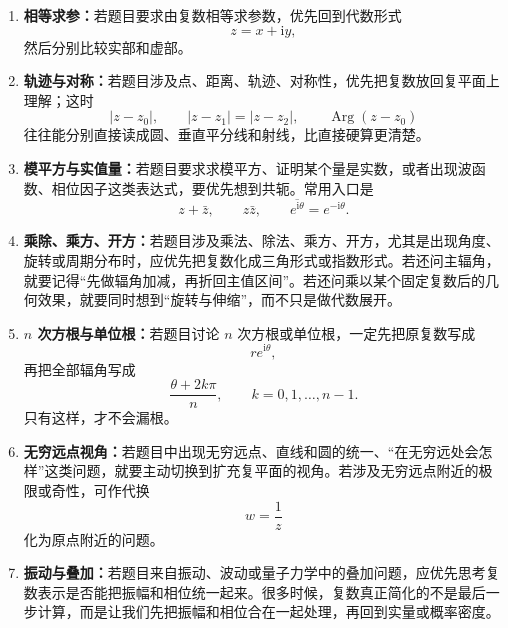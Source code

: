 \begin{tishi}[本章做题的判断思路]
\begin{enumerate}
    \item \textbf{相等求参：}若题目要求由复数相等求参数，优先回到代数形式
    \[
        z=x+\mathrm{i}y,
    \]
    然后分别比较实部和虚部。

    \item \textbf{轨迹与对称：}若题目涉及点、距离、轨迹、对称性，优先把复数放回复平面上理解；这时
    \[
        |z-z_0|,\qquad |z-z_1|=|z-z_2|,\qquad \operatorname{Arg}(z-z_0)
    \]
    往往能分别直接读成圆、垂直平分线和射线，比直接硬算更清楚。

    \item \textbf{模平方与实值量：}若题目要求求模平方、证明某个量是实数，或者出现波函数、相位因子这类表达式，要优先想到共轭。常用入口是
    \[
        z+\bar z,\qquad z\bar z,\qquad \overline{e^{\mathrm{i}\theta}}=e^{-\mathrm{i}\theta}.
    \]

    \item \textbf{乘除、乘方、开方：}若题目涉及乘法、除法、乘方、开方，尤其是出现角度、旋转或周期分布时，应优先把复数化成三角形式或指数形式。若还问主辐角，就要记得``先做辐角加减，再折回主值区间''。若还问乘以某个固定复数后的几何效果，就要同时想到``旋转与伸缩''，而不只是做代数展开。

    \item \textbf{$n$ 次方根与单位根：}若题目讨论 $n$ 次方根或单位根，一定先把原复数写成
    \[
        re^{\mathrm{i}\theta},
    \]
    再把全部辐角写成
    \[
        \frac{\theta+2k\pi}{n},\qquad k=0,1,\dots,n-1.
    \]
    只有这样，才不会漏根。

    \item \textbf{无穷远点视角：}若题目中出现无穷远点、直线和圆的统一、``在无穷远处会怎样''这类问题，就要主动切换到扩充复平面的视角。若涉及无穷远点附近的极限或奇性，可作代换
    \[
        w=\frac{1}{z}
    \]
    化为原点附近的问题。

    \item \textbf{振动与叠加：}若题目来自振动、波动或量子力学中的叠加问题，应优先思考复数表示是否能把振幅和相位统一起来。很多时候，复数真正简化的不是最后一步计算，而是让我们先把振幅和相位合在一起处理，再回到实量或概率密度。
\end{enumerate}
\end{tishi}

